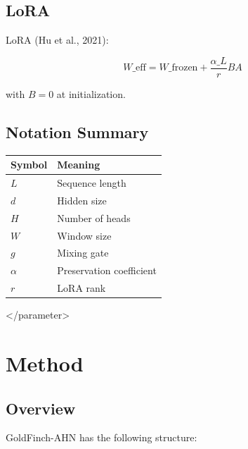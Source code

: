 \subsection{LoRA}

LoRA (Hu et al., 2021):

\[
W\_\text{eff} = W\_\text{frozen} + \frac{\alpha\_L}{r} BA
\tag{3.6}
\]

with $B = 0$ at initialization.

\subsection{Notation Summary}

\begin{table}[H]
\centering
\small
\begin{tabular}{ll}
\toprule
\textbf{Symbol} & \textbf{Meaning} \\
\midrule
$L$ & Sequence length \\
$d$ & Hidden size \\
$H$ & Number of heads \\
$W$ & Window size \\
$g$ & Mixing gate \\
$\alpha$ & Preservation coefficient \\
$r$ & LoRA rank \\
\bottomrule
\end{tabular}
\end{table}
\textless{}/parameter\textgreater{}




\section{Method}

\subsection{Overview}

GoldFinch-AHN has the following structure:

